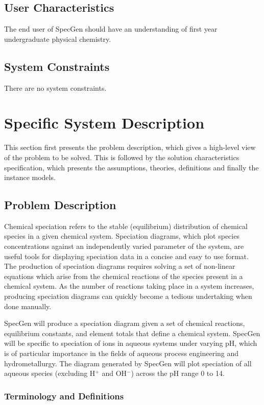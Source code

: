 \documentclass[12pt]{article}
\newcommand{\progname}{SpecGen} %
\begin{document}
\subsection{User Characteristics} \label{SecUserCharacteristics}
The end user of \progname{} should have an understanding of first year undergraduate physical chemistry.

\subsection{System Constraints}
There are no system constraints.

\section{Specific System Description}

This section first presents the problem description, which gives a high-level
view of the problem to be solved.  This is followed by the solution characteristics
specification, which presents the assumptions, theories, definitions and finally
the instance models.

\subsection{Problem Description} \label{Sec_pd}
Chemical speciation refers to the stable (equilibrium) distribution of chemical species in a given chemical system.   Speciation diagrams, which plot species concentrations against an independently varied parameter of the system, are useful tools for displaying speciation data in a concise and easy to use format.  The production of speciation diagrams requires solving a set of non-linear equations which arise from the chemical reactions of the species present in a chemical system.  As the number of reactions taking place in a system increases, producing speciation diagrams can quickly become a tedious undertaking when done manually.

\progname{} will produce a speciation diagram given a set of chemical reactions, equilibrium constants, and element totals that define a chemical system.  \progname{} will be specific to speciation of ions in aqueous systems under varying pH, which is of particular importance in the fields of aqueous process engineering and hydrometallurgy.  The diagram generated by \progname{} will plot speciation of all aqueous species (excluding H$^+$ and OH$^-$) across the pH range 0 to 14.

\subsubsection{Terminology and Definitions}
\end{document}

